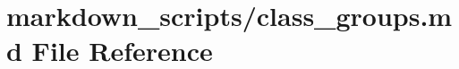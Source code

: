 \hypertarget{class__groups_8md}{\section{markdown\-\_\-scripts/class\-\_\-groups.md File Reference}
\label{class__groups_8md}
}
